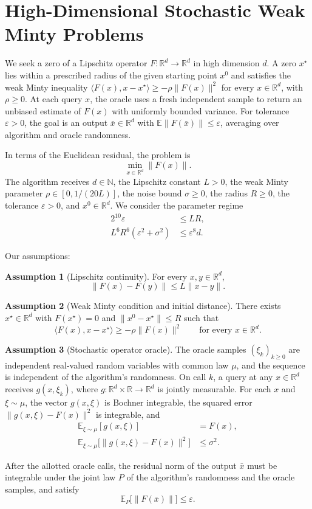 \documentclass[10pt]{article}
\theoremstyle{definition}
\newtheorem{assumption}{Assumption}
\begin{document}
\section*{High-Dimensional Stochastic Weak Minty Problems}
We seek a zero of a Lipschitz operator $F:\mathbb{R}^d\to\mathbb{R}^d$ in high dimension $d$. A zero $x^\star$ lies within a prescribed radius of the given starting point $x^0$ and satisfies the weak Minty inequality $\langle F(x),x-x^\star\rangle\geq-\rho\|F(x)\|^2$ for every $x\in\mathbb{R}^d$, with $\rho\geq 0$. At each query $x$, the oracle uses a fresh independent sample to return an unbiased estimate of $F(x)$ with uniformly bounded variance. For tolerance $\varepsilon>0$, the goal is an output $\bar{x}\in\mathbb{R}^d$ with $\mathbb{E}\|F(\bar{x})\|\leq\varepsilon$, averaging over algorithm and oracle randomness.

In terms of the Euclidean residual, the problem is
\[
\min_{x\in\mathbb{R}^d}\|F(x)\|.
\]
The algorithm receives $d\in\mathbb{N}$, the Lipschitz constant $L>0$, the weak Minty parameter $\rho\in[0,1/(20L)]$, the noise bound $\sigma\geq 0$, the radius $R\geq 0$, the tolerance $\varepsilon>0$, and $x^0\in\mathbb{R}^d$. We consider the parameter regime
\[
\begin{aligned}
2^{10}\varepsilon &\leq LR,\\
L^6R^6(\varepsilon^2+\sigma^2) &\leq \varepsilon^8 d.
\end{aligned}
\]

Our assumptions:
\begin{assumption}[Lipschitz continuity]
For every $x,y\in\mathbb{R}^d$,
\[
\|F(x)-F(y)\|\leq L\|x-y\|.
\]
\end{assumption}

\begin{assumption}[Weak Minty condition and initial distance]
There exists $x^\star\in\mathbb{R}^d$ with $F(x^\star)=0$ and $\|x^0-x^\star\|\leq R$ such that
\[
\langle F(x),x-x^\star\rangle\geq-\rho\|F(x)\|^2
\qquad\text{for every }x\in\mathbb{R}^d.
\]
\end{assumption}

\begin{assumption}[Stochastic operator oracle]
The oracle samples $(\xi_k)_{k\geq 0}$ are independent real-valued random variables with common law $\mu$, and the sequence is independent of the algorithm's randomness. On call $k$, a query at any $x\in\mathbb{R}^d$ receives $g(x,\xi_k)$, where $g:\mathbb{R}^d\times\mathbb{R}\to\mathbb{R}^d$ is jointly measurable. For each $x$ and $\xi\sim\mu$, the vector $g(x,\xi)$ is Bochner integrable, the squared error $\|g(x,\xi)-F(x)\|^2$ is integrable, and
\[
\begin{aligned}
\mathbb{E}_{\xi\sim\mu}[g(x,\xi)] &= F(x),\\
\mathbb{E}_{\xi\sim\mu}\bigl[\|g(x,\xi)-F(x)\|^2\bigr] &\leq \sigma^2.
\end{aligned}
\]
\end{assumption}

After the allotted oracle calls, the residual norm of the output $\bar{x}$ must be integrable under the joint law $P$ of the algorithm's randomness and the oracle samples, and satisfy
\[
\mathbb{E}_{P}\bigl[\|F(\bar{x})\|\bigr]\leq\varepsilon.
\]
\end{document}
